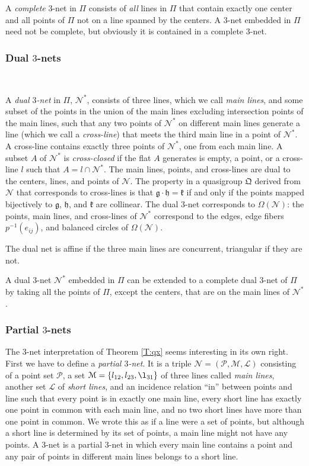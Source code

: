 \documentclass[reqno,12pt]{amsart}
\theoremstyle{remark}
\numberwithin{equation}{section}
\numberwithin{figure}{section}
\newcommand \inv{^{-1}}
\renewcommand \cL{\mathcal{L}}	%
\newcommand \cM{\mathcal{M}}
\newcommand \cN{\mathcal{N}}
\newcommand \cP{\mathcal{P}}
\newcommand \fQ{\mathfrak Q}
\newcommand\Qg{\mathfrak g}
\newcommand\Qh{\mathfrak h}
\newcommand\Qk{\mathfrak k}
\newcommand\PP{\Pi}	%
\begin{document}
A \emph{complete} $3$-net in $\PP$ consists of \emph{all} lines in $\PP$ that contain exactly one center and all points of $\PP$ not on a line spanned by the centers.  A $3$-net embedded in $\PP$ need not be complete, but obviously it is contained in a complete $3$-net.  

\subsubsection{Dual $3$-nets}\label{dualnets}\

A \emph{dual $3$-net} in $\PP$, $\cN^*$, consists of three lines, which we call \emph{main lines}, and some subset of the points in the union of the main lines excluding intersection points of the main lines, such that any two points of $\cN^*$ on different main lines generate a line (which we call a \emph{cross-line}) that meets the third main line in a point of $\cN^*$.  A cross-line contains exactly three points of $\cN^*$, one from each main line.  
A subset $A$ of $\cN^*$ is \emph{cross-closed} if the flat $A$ generates is empty, a point, or a cross-line $l$ such that $A = l \cap \cN^*$.
The main lines, points, and cross-lines are dual to the centers, lines, and points of $\cN$.  
The property in a quasigroup $\fQ$ derived from $\cN$ that corresponds to cross-lines is that $\Qg\cdot\Qh=\Qk$ if and only if the points mapped bijectively to $\Qg$, $\Qh$, and $\Qk$ are collinear.  
The dual $3$-net corresponds to $\Omega(\cN)$: the points, main lines, and cross-lines of $\cN^*$ correspond to the edges, edge fibers $p\inv(e_{ij})$, and balanced circles of $\Omega(\cN)$.  

The dual net is affine if the three main lines are concurrent, triangular if they are not.  

A dual $3$-net $\cN^*$ embedded in $\PP$ can be extended to a complete dual $3$-net of $\PP$ by taking all the points of $\PP$, except the centers, that are on the main lines of $\cN^*$.

\subsubsection{Partial $3$-nets}\label{p3nets}

The $3$-net interpretation of Theorem \ref{T:qx} seems interesting in its own right.  
First we have to define a \emph{partial $3$-net}.  It is a triple $\cN=(\cP,\cM,\cL)$ consisting of a point set $\cP$, a set $\cM=\{l_{12},l_{23},\l_{31}\}$ of three lines called \emph{main lines}, another set $\cL$ of \emph{short lines}, and an incidence relation ``in'' between points and line such that every point is in exactly one main line, every short line has exactly one point in common with each main line, and no two short lines have more than one point in common.  We wrote this as if a line were a set of points, but although a short line is determined by its set of points, a main line might not have any points.  A $3$-net is a partial $3$-net in which every main line contains a point and any pair of points in different main lines belongs to a short line.
\end{document}
